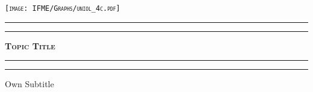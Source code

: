 \documentclass[a4paper, 12pt, twoside, english]{article}
\begin{document}
\def\biblio{} %










\begin{titlepage}
	

	\begin{center}
	
	\scshape %
	\texttt{[image: IFME/Graphs/uniol\_4c.pdf]}
	\vspace*{\baselineskip} %
	\vspace{-1.5cm}
	
	\rule{\textwidth}{1.6pt}\vspace*{-\baselineskip}\vspace*{2pt} %
	\rule{\textwidth}{0.4pt} %
	\vspace{-0.9cm}
	\vspace{0.35\baselineskip} %
	
	{\rmfamily\scshape\LARGE  \textbf{Topic Title\\}} %
	
	\vspace{0.35\baselineskip} %
	
	\rule{\textwidth}{0.4pt}\vspace*{-\baselineskip}\vspace{3.2pt} %
	\rule{\textwidth}{1.6pt} %
	
	\vspace{0.1\baselineskip} %
	

    Own Subtitle%
	
	\vspace*{1.5\baselineskip} %
    
    \end{center}
    


\end{titlepage}
\end{document}
